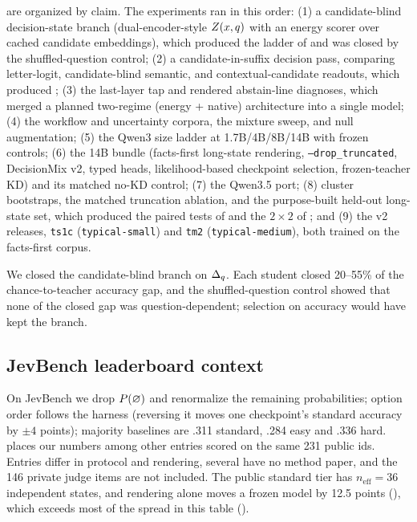  are organized by claim. The experiments ran in this order:
(1) a candidate-blind decision-state branch (dual-encoder-style $Z(x,q)$ with an energy scorer
over cached candidate embeddings), which produced the ladder of  and was closed by the
shuffled-question control; (2) a candidate-in-suffix decision pass, comparing letter-logit,
candidate-blind semantic, and contextual-candidate readouts, which produced ; (3) the
last-layer tap and rendered abstain-line diagnoses, which merged a planned two-regime (energy + native)
architecture into a single model; (4) the workflow and uncertainty corpora, the mixture sweep, and null
augmentation; (5) the Qwen3 size ladder at 1.7B/4B/8B/14B with frozen controls; (6) the 14B bundle
(facts-first long-state rendering, \texttt{--drop\_truncated}, DecisionMix v2, typed heads,
likelihood-based checkpoint selection, frozen-teacher KD) and its matched no-KD control; (7) the
Qwen3.5 port; (8) cluster bootstraps, the matched truncation ablation, and the purpose-built held-out
long-state set, which produced the paired tests of  and the $2\times2$ of
; and (9) the v2 releases, \texttt{ts1c} (\texttt{typical-small}) and
\texttt{tm2} (\texttt{typical-medium}), both trained on the facts-first corpus.

We closed the candidate-blind branch on $\Delta_q$. Each student closed 20--55\% of the chance-to-teacher
accuracy gap, and the shuffled-question control showed that none of the closed gap was
question-dependent; selection on accuracy would have kept the branch.

\subsection{JevBench leaderboard context}
\label{app:leaderboard}

On JevBench we drop $P(\varnothing)$ and renormalize the remaining probabilities; option order follows the
harness (reversing it moves one checkpoint's standard accuracy by $\pm4$ points); majority baselines are
.311 standard, .284 easy and .336 hard.  places our numbers among other entries scored on the same 231 public ids.
Entries differ in protocol and rendering, several have no method paper, and the 146 private judge items
are not included. The public standard tier has $n_{\mathrm{eff}}{=}36$ independent states, and rendering
alone moves a frozen model by 12.5 points (), which exceeds most of the
spread in this table ().

